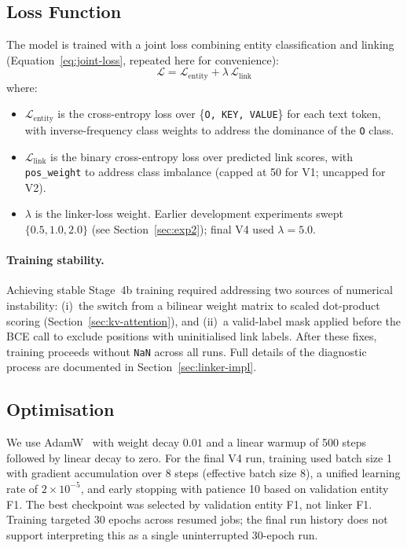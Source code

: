 \subsection{Loss Function}
\label{sec:loss-function}

The model is trained with a joint loss combining entity classification and
linking (Equation~\ref{eq:joint-loss}, repeated here for convenience):
\[
  \mathcal{L} = \mathcal{L}_{\text{entity}} + \lambda\,\mathcal{L}_{\text{link}}
\]
where:
\begin{itemize}
  \item $\mathcal{L}_{\text{entity}}$ is the cross-entropy loss over
  \{\texttt{O, KEY, VALUE}\} for each text token, with inverse-frequency
  class weights to address the dominance of the \texttt{O} class.
  \item $\mathcal{L}_{\text{link}}$ is the binary cross-entropy loss over
  predicted link scores, with \texttt{pos\_weight} to address class imbalance
  (capped at 50 for V1; uncapped for V2).
  \item $\lambda$ is the linker-loss weight. Earlier development experiments
  swept $\{0.5, 1.0, 2.0\}$ (see Section~\ref{sec:exp2}); final V4 used
  $\lambda=5.0$.
\end{itemize}

\paragraph{Training stability.}
Achieving stable Stage~4b training required addressing two sources of
numerical instability: (i)~the switch from a bilinear weight matrix to
scaled dot-product scoring (Section~\ref{sec:kv-attention}), and
(ii)~a valid-label mask applied before the BCE call to exclude positions
with uninitialised link labels. After these fixes, training proceeds
without \texttt{NaN} across all runs. Full details of the diagnostic
process are documented in Section~\ref{sec:linker-impl}.

\subsection{Optimisation}
\label{sec:optimisation}

We use AdamW~\cite{loshchilov2019decoupled} with weight decay $0.01$ and a
linear warmup of 500 steps followed by linear decay to zero. For the final V4
run, training used batch size 1 with gradient accumulation over 8 steps
(effective batch size 8), a unified learning rate of $2\times10^{-5}$, and
early stopping with patience 10 based on validation entity F1. The best
checkpoint was selected by validation entity F1, not linker F1. Training
targeted 30 epochs across resumed jobs; the final run history does not support
interpreting this as a single uninterrupted 30-epoch run.

